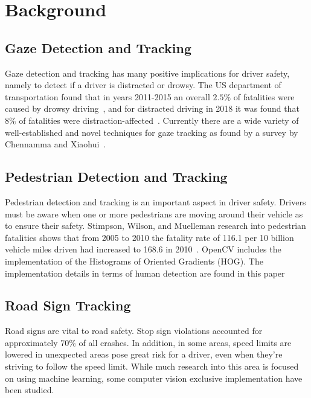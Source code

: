 \section{Background}
\subsection{Gaze Detection and Tracking}

Gaze detection and tracking has many positive implications for driver safety, namely to detect if a driver is distracted or drowsy. The US department of transportation found that in years 2011-2015 an overall $2.5\%$ of fatalities were caused by drowsy driving~\cite{CrashDrowsy}, and for distracted driving in 2018 it was found that $8\%$ of fatalities were distraction-affected~\cite{CrashDistracted}. Currently there are a wide variety of well-established and novel techniques for gaze tracking as found by a survey by Chennamma and Xiaohui~\cite{chennamma2013survey}. 

\subsection{Pedestrian Detection and Tracking}

Pedestrian detection and tracking is an important aspect in driver safety. Drivers must be aware when one or more pedestrians are moving around their vehicle as to ensure their safety. Stimpson, Wilson, and Muelleman research into pedestrian fatalities shows that from 2005 to 2010 the fatality rate of 116.1 per 10 billion vehicle miles driven had increased to 168.6 in 2010~\cite{PedestrianFatalities}.
OpenCV includes the implementation of the Histograms of Oriented Gradients (HOG).
The implementation details in terms of human detection are found in this paper\cite{HOGHumanDetection}

\subsection{Road Sign Tracking}
Road signs are vital to road safety. 
Stop sign violations accounted for approximately 70\% of all crashes.\cite{Pubmed}
In addition, in some areas, speed limits are lowered in unexpected areas pose great risk for a driver, even when they're striving to follow the speed limit.
While much research into this area is focused on using machine learning, some computer vision exclusive implementation have been studied.\cite{Ayaou2020}